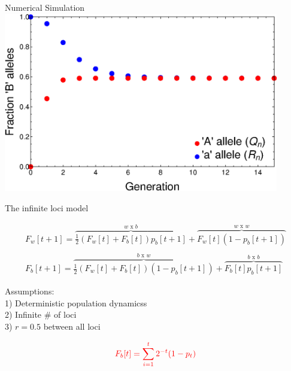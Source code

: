 \documentclass{beamer}
\begin{document}
\begin{frame}{Numerical Simulation}
\includegraphics[width=0.9\textwidth]{Figures/NumericalSolution.eps}

\end{frame}

\begin{frame}{The infinite loci model}

\begin{equation}
    \begin{array}{l}
	F_w[t+1] = \overbrace{\frac{1}{2} (F_w[t]+F_b[t]) p_b[t+1]}^\text{$w$ x $b$}  + \overbrace{F_w[t] (1-p_b[t+1])}^\text{$w$ x $w$}
	 \\ \\
	F_b[t+1]  = \overbrace{\frac{1}{2} (F_w[t]+F_b[t]) (1-p_b[t+1])}^\text{$b$ x $w$} 
	+ \overbrace{F_b[t] p_b[t+1]}^\text{$b$ x $b$}
	\end{array}
\end{equation}

Assumptions: \\
1) Deterministic population dynamicss \\
2) Infinite \# of loci \\
3) $r = 0.5$ between all loci 
    
\begin{equation*}
    \color{red} F_b[t] = \sum_{i=1}^t 2^{-t} (1-p_t)
\end{equation*}
\end{frame}
\end{document}
